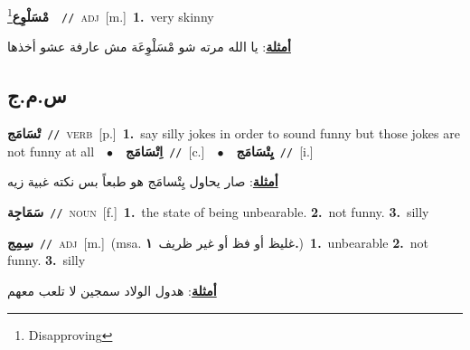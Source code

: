 \documentclass[10pt,a4paper,twoside]{article} %
\begin{document}
\begin{multicols}{2}
{\setlength\topsep{0pt}\textbf{\foreignlanguage{arabic}{مْسَلْوِع}}\footnote{Disapproving}\ \ {\color{gray}\texttt{//}\color{black}}\ \textsc{adj}\ [m.]\ \textbf{1.}~very skinny\  \begin{flushright}\color{gray}\foreignlanguage{arabic}{\textbf{\underline{\foreignlanguage{arabic}{أمثلة}}}: يا الله مرته شو مْسَلْوِعَة مش عارفة عشو أخذها}\end{flushright}\color{black}} \vspace{2mm}

\vspace{-3mm}
\subsection*{\color{blue}\foreignlanguage{arabic}{س.م.ج}\color{blue}{}} 

{\setlength\topsep{0pt}\textbf{\foreignlanguage{arabic}{تْسَامَج}}\ {\color{gray}\texttt{//}\color{black}}\ \textsc{verb}\ [p.]\ \textbf{1.}~say silly jokes in order to sound funny but those jokes are not funny at all\ \ $\bullet$\ \ \setlength\topsep{0pt}\textbf{\foreignlanguage{arabic}{اِتْسَامَج}}\ {\color{gray}\texttt{//}\color{black}}\ [c.]\ \ $\bullet$\ \ \setlength\topsep{0pt}\textbf{\foreignlanguage{arabic}{يِتْسَامَج}}\ {\color{gray}\texttt{//}\color{black}}\ [i.]\  \begin{flushright}\color{gray}\foreignlanguage{arabic}{\textbf{\underline{\foreignlanguage{arabic}{أمثلة}}}: صار يحاول يِتْسامَج هو طبعاً بس نكته غبية زيه}\end{flushright}\color{black}} \vspace{2mm}

{\setlength\topsep{0pt}\textbf{\foreignlanguage{arabic}{سَمَاجِة}}\ {\color{gray}\texttt{//}\color{black}}\ \textsc{noun}\ [f.]\ \textbf{1.}~the state of being unbearable.  \textbf{2.}~not funny.  \textbf{3.}~silly\ } \vspace{2mm}

{\setlength\topsep{0pt}\textbf{\foreignlanguage{arabic}{سِمِج}}\ {\color{gray}\texttt{//}\color{black}}\ \textsc{adj}\ [m.]\ \color{gray}(msa. \foreignlanguage{arabic}{غليظ أو فظ أو غير ظريف}~\foreignlanguage{arabic}{\textbf{١.}})\color{black}\ \textbf{1.}~unbearable  \textbf{2.}~not funny.  \textbf{3.}~silly\  \begin{flushright}\color{gray}\foreignlanguage{arabic}{\textbf{\underline{\foreignlanguage{arabic}{أمثلة}}}: هدول الولاد سمجين لا تلعب معهم}\end{flushright}\color{black}} \vspace{2mm}


\end{multicols}
\end{document}
